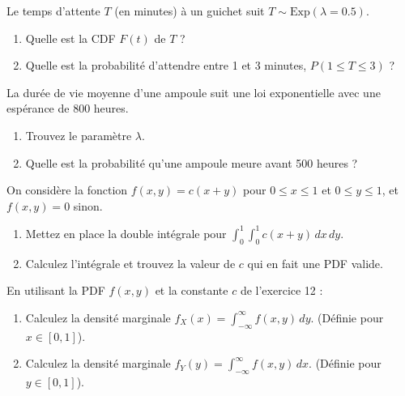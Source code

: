 \begin{exercicebox}
Le temps d'attente $T$ (en minutes) à un guichet suit $T \sim \text{Exp}(\lambda=0.5)$.
\begin{enumerate}
    \item Quelle est la CDF $F(t)$ de $T$ ?
    \item Quelle est la probabilité d'attendre entre 1 et 3 minutes, $P(1 \le T \le 3)$ ?
\end{enumerate}
\end{exercicebox}

\begin{exercicebox}
La durée de vie moyenne d'une ampoule suit une loi exponentielle avec une espérance de 800 heures.
\begin{enumerate}
    \item Trouvez le paramètre $\lambda$.
    \item Quelle est la probabilité qu'une ampoule meure avant 500 heures ?
\end{enumerate}
\end{exercicebox}


\begin{exercicebox}
On considère la fonction $f(x, y) = c(x+y)$ pour $0 \le x \le 1$ et $0 \le y \le 1$, et $f(x,y)=0$ sinon.
\begin{enumerate}
    \item Mettez en place la double intégrale pour $\int_0^1 \int_0^1 c(x+y) \, dx \, dy$.
    \item Calculez l'intégrale et trouvez la valeur de $c$ qui en fait une PDF valide.
\end{enumerate}
\end{exercicebox}

\begin{exercicebox}
En utilisant la PDF $f(x,y)$ et la constante $c$ de l'exercice 12 :
\begin{enumerate}
    \item Calculez la densité marginale $f_X(x) = \int_{-\infty}^{\infty} f(x, y) \, dy$. (Définie pour $x \in [0, 1]$).
    \item Calculez la densité marginale $f_Y(y) = \int_{-\infty}^{\infty} f(x, y) \, dx$. (Définie pour $y \in [0, 1]$).
\end{enumerate}
\end{exercicebox}

